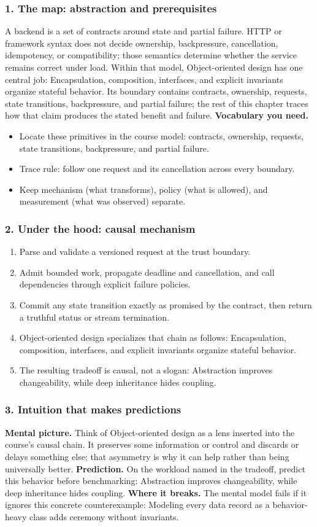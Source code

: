 \subsubsection*{1. The map: abstraction and prerequisites}
A backend is a set of contracts around state and partial failure. HTTP or framework syntax does not decide ownership, backpressure, cancellation, idempotency, or compatibility; those semantics determine whether the service remains correct under load.
Within that model, Object-oriented design has one central job: Encapsulation, composition, interfaces, and explicit invariants organize stateful behavior. Its boundary contains contracts, ownership, requests, state transitions, backpressure, and partial failure; the rest of this chapter traces how that claim produces the stated benefit and failure.
\textbf{Vocabulary you need.}\begin{itemize}
\item Locate these primitives in the course model: contracts, ownership, requests, state transitions, backpressure, and partial failure.
\item Trace rule: follow one request and its cancellation across every boundary.
\item Keep mechanism (what transforms), policy (what is allowed), and measurement (what was observed) separate.
\end{itemize}
\subsubsection*{2. Under the hood: causal mechanism}\begin{enumerate}
\item Parse and validate a versioned request at the trust boundary.
\item Admit bounded work, propagate deadline and cancellation, and call dependencies through explicit failure policies.
\item Commit any state transition exactly as promised by the contract, then return a truthful status or stream termination.
\item Object-oriented design specializes that chain as follows: Encapsulation, composition, interfaces, and explicit invariants organize stateful behavior.
\item The resulting tradeoff is causal, not a slogan: Abstraction improves changeability, while deep inheritance hides coupling.
\end{enumerate}
\subsubsection*{3. Intuition that makes predictions}
\textbf{Mental picture.} Think of Object-oriented design as a lens inserted into the course's causal chain. It preserves some information or control and discards or delays something else; that asymmetry is why it can help rather than being universally better.
\textbf{Prediction.} On the workload named in the tradeoff, predict this behavior before benchmarking: Abstraction improves changeability, while deep inheritance hides coupling.
\textbf{Where it breaks.} The mental model fails if it ignores this concrete counterexample: Modeling every data record as a behavior-heavy class adds ceremony without invariants.
